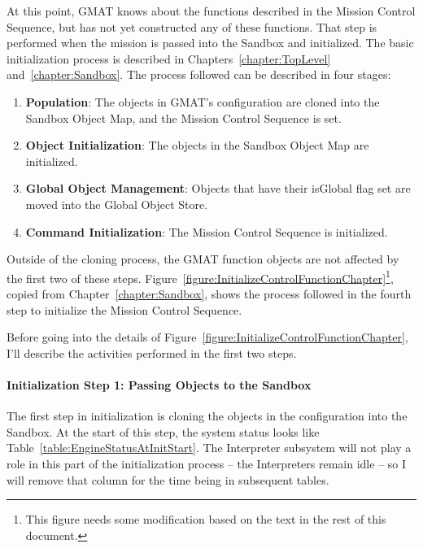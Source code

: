 At this point, GMAT knows about the functions described in the Mission Control Sequence, but has not
yet constructed any of these functions.  That step is performed when the mission is passed into the
Sandbox and initialized.  The basic initialization process is described in
Chapters~\ref{chapter:TopLevel} and~\ref{chapter:Sandbox}.  The process followed can be described in
four stages:

\begin{enumerate}
\item \textbf{Population}: The objects in GMAT's configuration are cloned into the Sandbox Object
Map, and the Mission Control Sequence is set.
\item \textbf{Object Initialization}: The objects in the Sandbox Object Map are initialized.
\item \textbf{Global Object Management}: Objects that have their isGlobal flag set are moved
into the Global Object Store.
\item \textbf{Command Initialization}: The Mission Control Sequence is initialized.
\end{enumerate}

Outside of the cloning process, the GMAT function objects are not affected by the first two of these
steps.  Figure~\ref{figure:InitializeControlFunctionChapter}\footnote{This figure needs some
modification based on the text in the rest of this document.}, copied from
Chapter~\ref{chapter:Sandbox}, shows the process followed in the fourth step to initialize the
Mission Control Sequence.

Before going into the details of Figure~\ref{figure:InitializeControlFunctionChapter}, I'll describe
the activities performed in the first two steps.

\paragraph{Initialization Step 1: Passing Objects to the Sandbox}  The first step in initialization
is cloning the objects in the configuration into the Sandbox.  At the start of this step, the system
status looks like Table~\ref{table:EngineStatusAtInitStart}.  The Interpreter subsystem will not
play a role in this part of the initialization process -- the Interpreters remain idle -- so I will
remove that column for the time being in subsequent tables.

